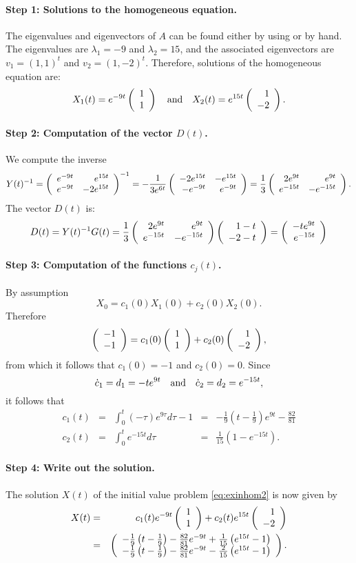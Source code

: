 \documentclass{ximera}
\begin{document}
\paragraph{Step 1: Solutions to the homogeneous equation.} The 
eigenvalues and 
eigenvectors of $A$ can be 
found either by using \Matlab or by hand.  The eigenvalues are $\lambda_1=-9$ 
and $\lambda_2=15$, and the associated eigenvectors are $v_1=(1,1)^t$ 
and $v_2=(1,-2)^t$.  Therefore, solutions of the homogeneous equation are:
\[
X_1(t) = e^{-9t}\left(\begin{array}{r} 1 \\ 1\end{array}\right) \quad\mbox{and}\quad X_2(t) = e^{15t}\left(\begin{array}{r} 1 \\ -2\end{array}\right).
\]

\paragraph{Step 2: Computation of the vector $D(t)$.}   We compute the inverse 
\[
Y(t)^{-1} = \left(\begin{array}{rr} e^{-9t} & e^{15t}\\ e^{-9t} &-2e^{15t}\end{array}\right)^{-1} = 
-\frac{1}{3e^{6t}}\left(\begin{array}{rr} -2e^{15t} & -e^{15t}\\ -e^{-9t} &e^{-9t}\end{array}\right) =
\frac{1}{3}\left(\begin{array}{rr} 2e^{9t} & e^{9t}\\ e^{-15t} &-e^{-15t}\end{array}\right).
\]
The vector $D(t)$ is:
\[
D(t) = Y(t)^{-1} G(t) = 
\frac{1}{3}\left(\begin{array}{rr} 2e^{9t} & e^{9t}\\ e^{-15t} &-e^{-15t}\end{array}\right)\left(\begin{array}{r} 1-t \\ -2-t\end{array}\right)
= \left(\begin{array}{r} -te^{9t} \\ e^{-15t}\end{array}\right)
\]

\paragraph{Step 3: Computation of the functions $c_j(t)$.}   By assumption 
\[
X_0=c_1(0)X_1(0)+c_2(0)X_2(0).
\]
Therefore
\[
\left(\begin{array}{r} -1 \\ -1\end{array}\right) = c_1(0)\left(\begin{array}{r} 1 \\ 1\end{array}\right) + c_2(0)\left(\begin{array}{r} 1 \\ -2\end{array}\right),
\]
from which it follows that $c_1(0)=-1$ and $c_2(0)=0$.  Since
\[
\dot{c}_1 = d_1 = -te^{9t}  \quad\mbox{and}\quad \dot{c}_2 = d_2 = e^{-15t},
\]
it follows that 
\[
\begin{array}{rclcl}
c_1(t) & = & \int_0^t (-\tau) e^{9\tau}d\tau - 1
& = &  -\frac{1}{9}\left(t-\frac{1}{9}\right)e^{9t}-\frac{82}{81} \\
c_2(t) & = & \int_0^t e^{-15t}d\tau & = & \frac{1}{15}\left(1-e^{-15t}\right).
\end{array}
\]

\paragraph{Step 4: Write out the solution.}  The solution $X(t)$ of the 
initial value problem \eqref{eq:exinhom2} is now given by
\begin{eqnarray*}
X(t) & = & c_1(t)e^{-9t}\left(\begin{array}{r} 1 \\ 1\end{array}\right) + c_2(t)e^{15t}\left(\begin{array}{r} 1 \\ -2\end{array}\right) \\
& = &  \left(\begin{array}{c}
-\frac{1}{9}\left(t-\frac{1}{9}\right)-
\frac{82}{81}e^{-9t}+\frac{1}{15}\left( e^{15t}-1\right)\\
-\frac{1}{9}\left(t-\frac{1}{9}\right)-
\frac{82}{81}e^{-9t}-\frac{2}{15}\left( e^{15t}-1\right)
\end{array}\right).
\end{eqnarray*}
\end{document}
